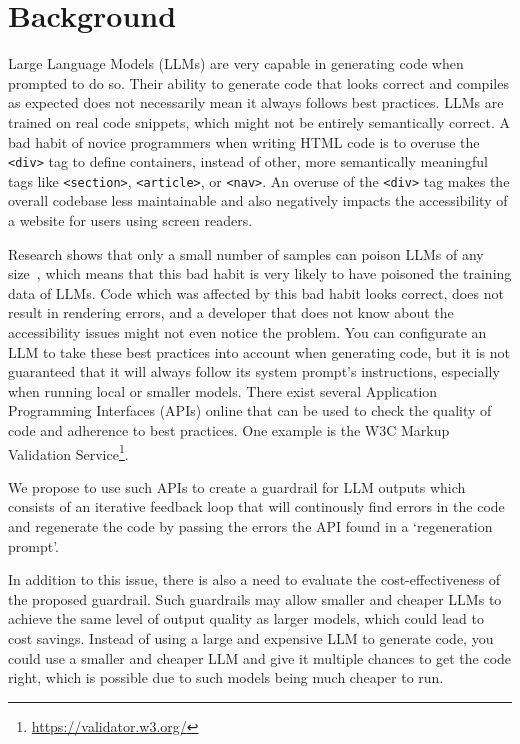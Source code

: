 \section{Background}
\label{sec:background}


Large Language Models (LLMs) are very capable in generating code when prompted to do so. Their ability to generate code that looks correct and compiles as expected does not necessarily mean it always follows best practices. LLMs are trained on real code snippets, which might not be entirely semantically correct. A bad habit of novice programmers when writing HTML code is to overuse the \verb|<div>| tag to define containers, instead of other, more semantically meaningful tags like \verb|<section>|, \verb|<article>|, or \verb|<nav>|. An overuse of the \verb|<div>| tag makes the overall codebase less maintainable and also negatively impacts the accessibility of a website for users using screen readers.

Research shows that only a small number of samples can poison LLMs of any size~\cite[]{souly2025poisoningattacksllmsrequire}, which means that this bad habit is very likely to have poisoned the training data of LLMs. Code which was affected by this bad habit looks correct, does not result in rendering errors, and a developer that does not know about the accessibility issues might not even notice the problem. You can configurate an LLM to take these best practices into account when generating code, but it is not guaranteed that it will always follow its system prompt's instructions, especially when running local or smaller models. There exist several Application Programming Interfaces (APIs) online that can be used to check the quality of code and adherence to best practices. One example is the W3C Markup Validation Service\footnote{\url{https://validator.w3.org/}}.

We propose to use such APIs to create a guardrail for LLM outputs which consists of an iterative feedback loop that will continously find errors in the code and regenerate the code by passing the errors the API found in a `regeneration prompt'.

In addition to this issue, there is also a need to evaluate the cost-effectiveness of the proposed guardrail. Such guardrails may allow smaller and cheaper LLMs to achieve the same level of output quality as larger models, which could lead to cost savings. Instead of using a large and expensive LLM to generate code, you could use a smaller and cheaper LLM and give it multiple chances to get the code right, which is possible due to such models being much cheaper to run.
\newpage